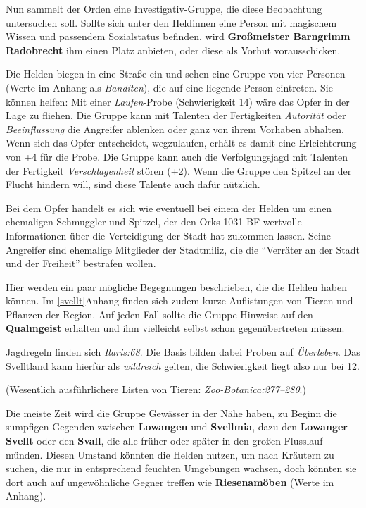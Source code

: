 Nun sammelt der Orden eine Investigativ-Gruppe, die diese Beobachtung untersuchen soll.
Sollte sich unter den Heldinnen eine Person mit magischem Wissen und passendem Sozialstatus befinden, wird \textbf{Großmeister Barngrimm Radobrecht} ihm einen Platz anbieten, oder diese als Vorhut vorausschicken.
\begin{center}
\end{center}

Die Helden biegen in eine Straße ein und sehen eine Gruppe von vier Personen (Werte im Anhang als \emph{Banditen}), die auf eine liegende Person eintreten.
Sie können helfen: Mit einer \emph{Laufen}-Probe (Schwierigkeit 14) wäre das Opfer in der Lage zu fliehen.
Die Gruppe kann mit Talenten der Fertigkeiten \emph{Autorität} oder \emph{Beeinflussung} die Angreifer ablenken oder ganz von ihrem Vorhaben abhalten.
Wenn sich das Opfer entscheidet, wegzulaufen, erhält es damit eine Erleichterung von +4 für die Probe.
Die Gruppe kann auch die Verfolgungsjagd mit Talenten der Fertigkeit \emph{Verschlagenheit} stören (+2).
Wenn die Gruppe den Spitzel an der Flucht hindern will, sind diese Talente auch dafür nützlich.

Bei dem Opfer handelt es sich wie eventuell bei einem der Helden um einen ehemaligen Schmuggler und Spitzel, der den Orks 1031 BF wertvolle Informationen über die Verteidigung der Stadt hat zukommen lassen. Seine Angreifer sind ehemalige Mitglieder der Stadtmiliz, die die \enquote{Verräter an der Stadt und der Freiheit} bestrafen wollen.


Hier werden ein paar mögliche Begegnungen beschrieben, die die Helden haben können. Im \ref{svellt}{Anhang} finden sich zudem kurze Auflistungen von Tieren und Pflanzen der Region. Auf jeden Fall sollte die Gruppe Hinweise auf den \textbf{Qualmgeist} erhalten und ihm vielleicht selbst schon gegenübertreten müssen.

Jagdregeln finden sich \emph{Ilaris:68}. Die Basis bilden dabei Proben auf \emph{Überleben}.
Das Svelltland kann hierfür als \emph{wildreich} gelten, die Schwierigkeit liegt also nur bei 12.

(Wesentlich ausführlichere Listen von Tieren: \emph{Zoo-Botanica:277--280}.)

Die meiste Zeit wird die Gruppe Gewässer in der Nähe haben, zu Beginn die sumpfigen Gegenden zwischen \textbf{Lowangen} und \textbf{Svellmia},
dazu den \textbf{Lowanger Svellt} oder den \textbf{Svall}, die alle früher oder später in den großen Flusslauf münden.
Diesen Umstand könnten die Helden nutzen, um nach Kräutern zu suchen, die nur in entsprechend feuchten Umgebungen wachsen, doch könnten sie dort auch auf ungewöhnliche Gegner treffen wie \textbf{Riesenamöben} (Werte im Anhang).

